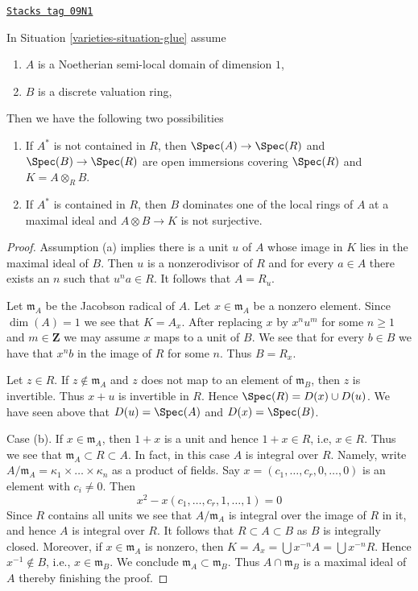 \begin{lemma}
\label{varieties-lemma-semi-local}
\href{https://stacks.math.columbia.edu/tag/09N1}{\texttt{Stacks tag 09N1}}

In Situation \ref{varieties-situation-glue} assume
\begin{enumerate}
\item $A$ is a Noetherian semi-local domain of dimension $1$,
\item $B$ is a discrete valuation ring,
\end{enumerate}
Then we have the following two possibilities
\begin{enumerate}
\item[(a)] If $A^*$ is not contained in $R$, then
$\Spec(A) \to \Spec(R)$ and $\Spec(B) \to \Spec(R)$
are open immersions covering $\Spec(R)$ and $K = A \otimes_R B$.
\item[(b)] If $A^*$ is contained in $R$, then $B$ dominates one of
the local rings of $A$ at a maximal ideal and $A \otimes B \to K$
is not surjective.
\end{enumerate}
\end{lemma}

\begin{proof}
Assumption (a) implies there is a unit $u$ of $A$ whose image in $K$ lies in
the maximal ideal of $B$. Then $u$ is a nonzerodivisor of $R$ and for
every $a \in A$ there exists an $n$ such that $u^n a \in R$. It follows
that $A = R_u$.

\medskip\noindent
Let $\mathfrak m_A$ be the Jacobson radical of $A$. Let $x \in \mathfrak m_A$
be a nonzero element. Since $\dim(A) = 1$ we see that $K = A_x$.
After replacing $x$ by $x^n u^m$ for some $n \geq 1$ and
$m \in \mathbf{Z}$ we may assume $x$ maps to a unit of $B$.
We see that for every $b \in B$ we have that $x^nb$
in the image of $R$ for some $n$. Thus $B = R_x$.

\medskip\noindent
Let $z \in R$. If $z \not \in \mathfrak m_A$ and $z$ does not map to
an element of $\mathfrak m_B$, then $z$ is invertible.
Thus $x + u$ is invertible in $R$. Hence $\Spec(R) = D(x) \cup D(u)$.
We have seen above that $D(u) = \Spec(A)$ and $D(x) = \Spec(B)$.

\medskip\noindent
Case (b). If $x \in \mathfrak m_A$, then $1 + x$ is a unit and
hence $1 + x \in R$, i.e, $x \in R$. Thus we see that
$\mathfrak m_A \subset R \subset A$. In fact, in this case
$A$ is integral over $R$. Namely, write
$A/\mathfrak m_A = \kappa_1 \times \ldots \times \kappa_n$
as a product of fields. Say $x = (c_1, \ldots, c_r, 0, \ldots, 0)$
is an element with $c_i \not = 0$. Then
$$
x^2 - x(c_1, \ldots, c_r, 1, \ldots, 1)  = 0
$$
Since $R$ contains all units we see that $A/\mathfrak m_A$ is
integral over the image of $R$ in it, and hence $A$ is integral over $R$.
It follows that $R \subset A \subset B$ as $B$ is integrally closed.
Moreover, if $x \in \mathfrak m_A$ is nonzero, then
$K = A_x = \bigcup x^{-n}A = \bigcup x^{-n}R$.
Hence $x^{-1} \not \in B$, i.e., $x \in \mathfrak m_B$.
We conclude $\mathfrak m_A \subset \mathfrak m_B$.
Thus $A \cap \mathfrak m_B$ is a maximal ideal of $A$ thereby
finishing the proof.
\end{proof}

